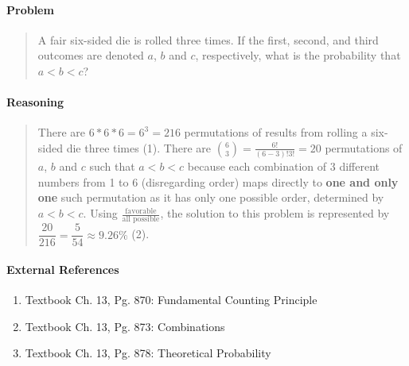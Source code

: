 \documentclass[letterpaper,12pt,twoside]{report}
\begin{document}
	\pagestyle{fancy}
	\fancyhf{}
	
	\paragraph{Problem}
	\begin{quote}
	\textsf{A fair six-sided die is rolled three times. If the first, second, and third outcomes are denoted $a$, $b$ and $c$, respectively, what is the probability that $a<b<c$?}
	\end{quote}
	
	\begin{center}
		\begin{tikzpicture}
		\end{tikzpicture}
	\end{center}
	
	\paragraph{Reasoning}
	\begin{quotation}
	
	There are $6*6*6=6^3=216$ permutations of results from rolling a six-sided die three times (1). There are $\binom{6}{3}=\frac{6!}{(6-3)!3!}=20$ permutations of $a$, $b$ and $c$ such that $a<b<c$ because each combination of 3 different numbers from 1 to 6 (disregarding order) maps directly to \textbf{one and only one} such permutation as it has only one possible order, determined by $a<b<c$. Using $\frac{\text{favorable}}{\text{all possible}}$, the solution to this problem is represented by $\dfrac{20}{216} =\boxed{\dfrac{5}{54} \approx 9.26\%}$ (2).
	
	\end{quotation}
	
	\paragraph{External References}
	
	\begin{enumerate}
		\item Textbook Ch. 13, Pg. 870: Fundamental Counting Principle
		\item Textbook Ch. 13, Pg. 873: Combinations
		\item Textbook Ch. 13, Pg. 878: Theoretical Probability
	\end{enumerate}
\end{document}
